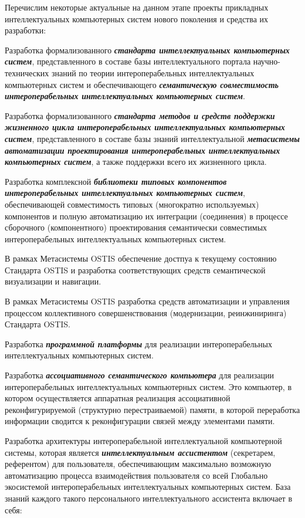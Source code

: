 Перечислим некоторые актуальные на данном этапе проекты прикладных интеллектуальных компьютерных систем нового поколения и средства их разработки:
\begin{textitemize}
	\item 
	Разработка формализованного \textbf{\textit{стандарта интеллектуальных компьютерных систем}}, представленного в составе базы интеллектуального портала научно-технических знаний по теории интероперабельных интеллектуальных компьютерных систем и обеспечивающего \textbf{\textit{семантическую совместимость интероперабельных интеллектуальных компьютерных систем}}.
	\medskip
	\item 
	Разработка формализованного \textbf{\textit{стандарта методов и средств поддержки жизненного цикла интероперабельных интеллектуальных компьютерных систем}}, представленного в составе базы знаний интеллектуальной \textbf{\textit{метасистемы автоматизации проектирования интероперабельных интеллектуальных компьютерных систем}}, а также поддержки всего их жизненного цикла.
	\medskip
	\item 
	Разработка комплексной \textbf{\textit{библиотеки типовых компонентов интероперабельных интеллектуальных компьютерных систем}}, обеспечивающей совместимость типовых (многократно используемых) компонентов и полную автоматизацию их интеграции (соединения) в процессе сборочного (компонентного) проектирования семантически совместимых интероперабельных интеллектуальных компьютерных систем.
	\medskip
	\item 
	В рамках Метасистемы OSTIS обеспечение  достпуа к текущему состоянию Стандарта OSTIS и разработка соответствующих средств семантической визуализации и навигации.
	\medskip
	\item 
	В рамках Метасистемы OSTIS разработка средств автоматизации и управления процессом коллективного совершенствования (модернизации, реинжиниринга) Стандарта OSTIS.
	\medskip
	\item
	Разработка \textbf{\textit{программной платформы}} для реализации интероперабельных интеллектуальных компьютерных систем.
	\medskip
	\item 
	Разработка \textbf{\textit{ассоциативного семантического компьютера}} для реализации интероперабельных интеллектуальных компьютерных систем. Это  компьютер, в котором осуществляется аппаратная реализация ассоциативной реконфигурируемой (структурно перестраиваемой) памяти, в которой переработка информации сводится к реконфигурации связей между элементами памяти.
	\item Разработка архитектуры интероперабельной интеллектуальной компьютерной системы, которая является \textbf{\textit{ интеллектуальным ассистентом}} (секретарем, референтом) для  пользователя, обеспечивающим максимально возможную автоматизацию процесса взаимодействия пользователя со всей Глобально экосистемой интероперабельных интеллектуальных компьютерных систем. База знаний каждого такого персонального интеллектуального ассистента включает в себя:

\end{textitemize}
